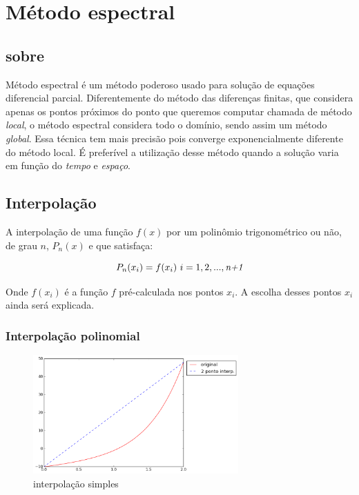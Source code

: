 \chapter{Método espectral}
\label{cap:I}
\section{sobre}

 Método espectral é um método poderoso usado para solução de equações diferencial parcial. Diferentemente do método das diferenças finitas, que considera apenas os pontos próximos do ponto que queremos computar chamada de método \emph{local}, o método espectral considera todo o domínio, sendo assim um método \emph{global}. Essa técnica tem mais precisão pois converge exponencialmente diferente do método local. É preferível a utilização desse método quando a solução varia em função do \textit{tempo} e \textit{espaço}.

\section{Interpolação}
 A interpolação de uma função $f(x)$ por um polinômio trigonométrico ou não, de grau $n$, $P_{n}(x)$ e que satisfaça:

\begin{equation}
	P_n (x_i) = f(x_i) \ i = 1,2,...,\emph{n+1}
\end{equation}

 Onde $f(x_i)$ é a função $f$ pré-calculada nos pontos $x_i$. A escolha desses pontos $x_i$ ainda será explicada.

\subsection{Interpolação polinomial}
 \begin{figure}[!ht]
  \includegraphics[width=0.7\textwidth,center]{figuras/interpolacao_linear.png}
  \caption{interpolação simples}
\end{figure}

